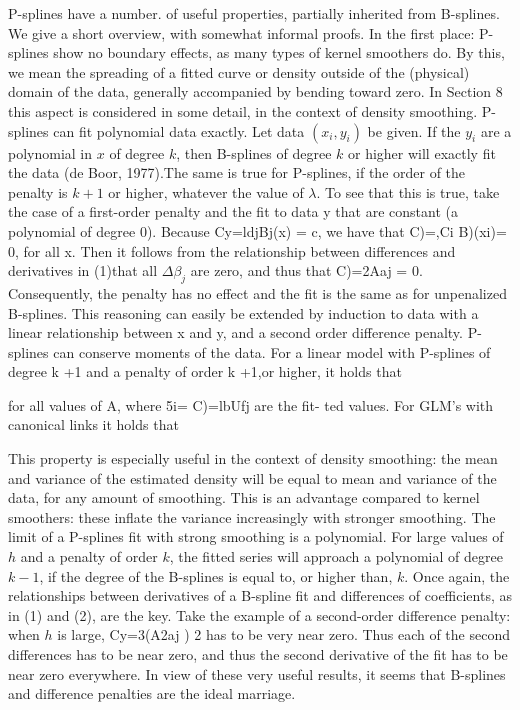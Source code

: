 \documentclass[12pt]{article}
\newcommand*\needsparaphrased{\color{red}}
\begin{document}
{{\needsparaphrased P-splines have a number. of useful properties, partially inherited from B-splines. We give a short overview, with somewhat informal proofs. In the first place: P-splines show no boundary effects, as many types of kernel smoothers do. By this, we mean the spreading of a fitted curve or density outside of the (physical) domain of the data, generally accompanied by bending toward zero. In Section 8 this aspect is considered in some detail, in the context of density smoothing. P-splines can fit polynomial data exactly. Let data $\left(x_i,y_i\right)$ be given. If the $y_i$ are a polynomial in $x$ of degree $k$, then B-splines of degree $k$ or higher will exactly fit the data (de Boor, 1977).The same is true for P-splines, if the order of the penalty is $k +1$ or higher, whatever the value of $\lambda$. To see that this is true, take the case of a first-order penalty and the fit to data y that are constant (a polynomial of degree 0). Because Cy=ldjBj(x) = c, we have that C)=,Ci B)(xi)= 0, for all x. Then it follows from the relationship between differences and derivatives in (1)that all $\Delta \beta_j$ are zero, and thus that C)=2Aaj = 0. Consequently, the penalty has no effect and the fit is the same as for unpenalized B-splines. This reasoning can easily be extended by induction to data with a linear relationship between x and y, and a second order difference penalty.
P-splines can conserve moments of the data. For a linear model with P-splines of degree k +1 and a penalty of order k +1,or higher, it holds that }

{\needsparaphrased  for all values of A, where 5i= C)=lbUfj are the fit- ted values. For GLM's with canonical links it holds that }

{\needsparaphrased This property is especially useful in the context of density smoothing: the mean and variance of the estimated density will be equal to mean and variance of the data, for any amount of smoothing. This is an advantage compared to kernel smoothers: these inflate the variance increasingly with stronger smoothing. The limit of a P-splines fit with strong smoothing is a polynomial. For large values of $h$ and a penalty of order $k$, the fitted series will approach a polynomial of degree $k-1$, if the degree of the B-splines is equal to, or higher than, $k$. Once again, the relationships between derivatives of a B-spline fit and differences of coefficients, as in (1) and (2), are the key. Take the example of a second-order difference penalty: when $h$ is large, Cy=3(A2aj ) 2 has to be very near zero. Thus each of the second differences has to be near zero, and thus the second derivative of the fit has to be near zero everywhere. In view of these very useful results, it seems that B-splines and difference penalties are the ideal marriage.

}}
\end{document}
